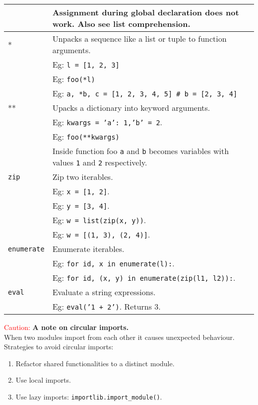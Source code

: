 \begin{tabularx}{\linewidth}{lX}
                                    & Assignment during global declaration does not work. Also see list comprehension.\\
    \hline
    *                               & Unpacks a sequence like a list or tuple to function arguments.\\
                                    & Eg: \texttt{l = [1, 2, 3]}\\
                                    & Eg: \texttt{foo(*l)}\\
                                    & Eg: \texttt{a, *b, c = [1, 2, 3, 4, 5] \# b = [2, 3, 4]}\\
    **                              & Upacks a dictionary into keyword arguments.\\
                                    & Eg: \texttt{kwargs = {'a': 1,'b' = 2}}.\\
                                    & Eg: \texttt{foo(**kwargs)}\\
                                    & Inside function foo \texttt{a} and \texttt{b} becomes variables with
                                      values \texttt{1} and \texttt{2} respectively.\\
    \hline
    \texttt{zip}                    & Zip two iterables.\\
                                    & Eg: \texttt{x = [1, 2]}.\\
                                    & Eg: \texttt{y = [3, 4]}.\\
                                    & Eg: \texttt{w = list(zip(x, y))}.\\
                                    & Eg: \texttt{w = [(1, 3), (2, 4)]}.\\
    \texttt{enumerate}              & Enumerate iterables.\\ 
                                    & Eg: \texttt{for id, x in enumerate(l):}.\\
                                    & Eg: \texttt{for id, (x, y) in enumerate(zip(l1, l2)):}.\\
    \hline
    \texttt{eval}                   & Evaluate a string expressions.\\
                                    & Eg: \texttt{eval('1 + 2')}. Returns 3.\\
    \hline
\end{tabularx}


\columnbreak

\textcolor{red}{Caution: }\textbf{A note on circular imports.}\\
When two modules import from each other it causes unexpected behaviour. Strategies to avoid circular imports:
\begin{enumerate}
\item Refactor shared functionalities to a distinct module.
\item Use local imports. 
\item Use lazy imports: \texttt{importlib.import\_module()}.
\end{enumerate}


